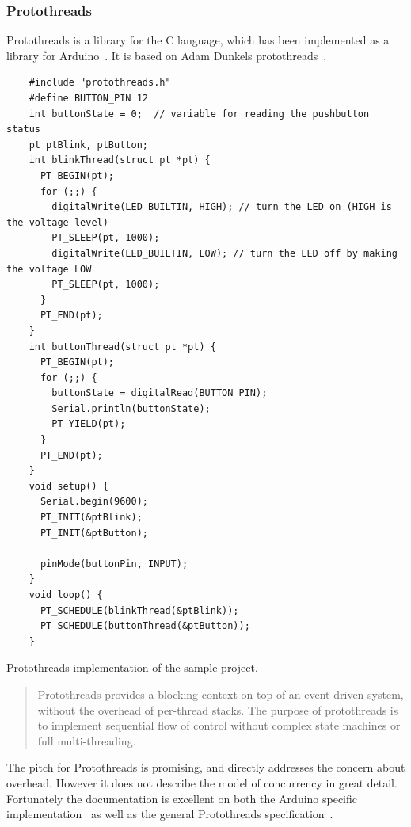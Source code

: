 \subsubsection{Protothreads}
Protothreads is a library for the C language, which has been implemented as a library for Arduino~\cite{Artin2020}. It is based on Adam Dunkels protothreads~\cite{AdamDunkelProtothreads}.


\begin{listing}[htb!]
  \centering
  \begin{verbatim}
    #include "protothreads.h"
    #define BUTTON_PIN 12
    int buttonState = 0;  // variable for reading the pushbutton status
    pt ptBlink, ptButton;
    int blinkThread(struct pt *pt) {
      PT_BEGIN(pt);
      for (;;) {
        digitalWrite(LED_BUILTIN, HIGH); // turn the LED on (HIGH is the voltage level)
        PT_SLEEP(pt, 1000);
        digitalWrite(LED_BUILTIN, LOW); // turn the LED off by making the voltage LOW
        PT_SLEEP(pt, 1000);
      }
      PT_END(pt);
    }
    int buttonThread(struct pt *pt) {
      PT_BEGIN(pt);
      for (;;) {
        buttonState = digitalRead(BUTTON_PIN);
        Serial.println(buttonState);
        PT_YIELD(pt);
      }
      PT_END(pt);
    }
    void setup() {
      Serial.begin(9600);
      PT_INIT(&ptBlink);
      PT_INIT(&ptButton);

      pinMode(buttonPin, INPUT);
    }
    void loop() {
      PT_SCHEDULE(blinkThread(&ptBlink));
      PT_SCHEDULE(buttonThread(&ptButton));
    }
  \end{verbatim}
  \caption{Protothreads implementation of the sample project.}
  \label{lst:protothreadsexample}
\end{listing}


\blockcquote{Artin2020, AdamDunkelProtothreads}{Protothreads provides a blocking context on top of an event-driven system, without the overhead of per-thread stacks. The purpose of protothreads is to implement sequential flow of control without complex state machines or full multi-threading.}

The pitch for Protothreads is promising, and directly addresses the concern about overhead. However it does not describe the model of concurrency in great detail. Fortunately the documentation is excellent on both the Arduino specific implementation~\cite{Artin2020} as well as the general Protothreads specification~\cite{AdamDunkelProtothreads}.


